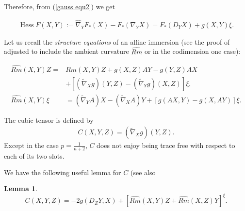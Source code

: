\documentclass{amsart}
\newtheorem{lemma}[theorem]{Lemma}
\theoremstyle{definition}
\theoremstyle{remark}
\numberwithin{equation}{section}
\begin{document}
Therefore, from (\ref{gauss equ2}) we get

\begin{align}\label{gauss equ3}
\operatorname{Hess}F(X,Y):=\hat{\nabla}_YF_{\ast}(X)-F_{\ast}(\nabla_YX)=F_{\ast}(D_YX)+g(X,Y)\xi.
\end{align}

Let us recall the \emph{structure equations} of an affine immersion (see the proof of \cite[Section II, Theorem 2.1]{MR1311248} adjusted to include the ambient curvature $\widehat{Rm}$ or \cite[p. 197 equations (N1.6)--(N1.9)]{MR1311248} in the codimension one case):

\begin{align}
\label{eq:structure1}
\widehat{Rm} (X, Y) Z =& Rm(X, Y) Z + g(X, Z) A Y - g(Y, Z)A X \\
&+ \left[(\tilde{\nabla}_X g) (Y, Z) - (\tilde{\nabla}_Y g)( X, Z)\right] \xi \nonumber,\\
\label{eq:sturcture2}
\widehat{Rm} (X, Y) \xi &= (\tilde{\nabla}_Y A) X - (\tilde{\nabla}_X A) Y + \left[g(AX, Y) - g(X, AY)\right]\xi.
\end{align}

The cubic tensor is defined by
\begin{align}
C(X,Y,Z) = (\tilde{\nabla}_X g) (Y,Z).
\end{align}
Except in the case $ p =\frac{1}{n+2}$, $ C$ does not enjoy being trace free with respect to each of its two slots.

We have the following useful lemma for $C$ (see also \cite[Section II, Proposition 4.1]{MR1311248}

\begin{lemma}
\[
C(X, Y, Z) =  -2g(D_Z Y, X) + \left[\widehat{Rm}(X, Y)Z + \widehat{Rm}(X, Z)Y\right]^{\xi}.
\]
\end{lemma}
\end{document}
